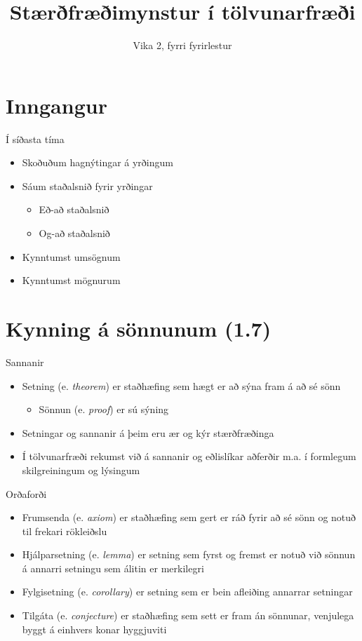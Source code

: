 \documentclass[handout]{beamer}
\title{Stærðfræðimynstur í tölvunarfræði}
\subtitle{Vika 2, fyrri fyrirlestur}
\begin{document}
\begin{frame}
    \titlepage
\end{frame}

\section{Inngangur}

\begin{frame}{Í síðasta tíma}
    \begin{itemize}
        \item Skoðuðum hagnýtingar á yrðingum
        \item Sáum staðalsnið fyrir yrðingar
        \begin{itemize}
            \item Eð-að staðalsnið
            \item Og-að staðalsnið
        \end{itemize}
        \item Kynntumst umsögnum
        \item Kynntumst mögnurum
    \end{itemize}
\end{frame}

\section{Kynning á sönnunum (1.7)}

\begin{frame}{Sannanir}
    \begin{itemize}
        \item Setning (e. \emph{theorem}) er staðhæfing sem hægt er að sýna fram á að sé sönn
        \begin{itemize}
            \item Sönnun (e. \emph{proof}) er sú sýning
        \end{itemize}
        \item Setningar og sannanir á þeim eru ær og kýr stærðfræðinga
        \item Í tölvunarfræði rekumst við á sannanir og eðlislíkar aðferðir m.a. í formlegum skilgreiningum og lýsingum
    \end{itemize}
\end{frame}

\begin{frame}{Orðaforði}
    \begin{itemize}
        \item Frumsenda (e. \emph{axiom}) er staðhæfing sem gert er ráð fyrir að sé sönn og notuð til frekari rökleiðslu
        \item Hjálparsetning (e. \emph{lemma}) er setning sem fyrst og fremst er notuð við sönnun á annarri setningu sem álitin er merkilegri
        \item Fylgisetning (e. \emph{corollary}) er setning sem er bein afleiðing annarrar setningar
        \item Tilgáta (e. \emph{conjecture}) er staðhæfing sem sett er fram án sönnunar, venjulega byggt á einhvers konar hyggjuviti
    \end{itemize}
\end{frame}
\end{document}
